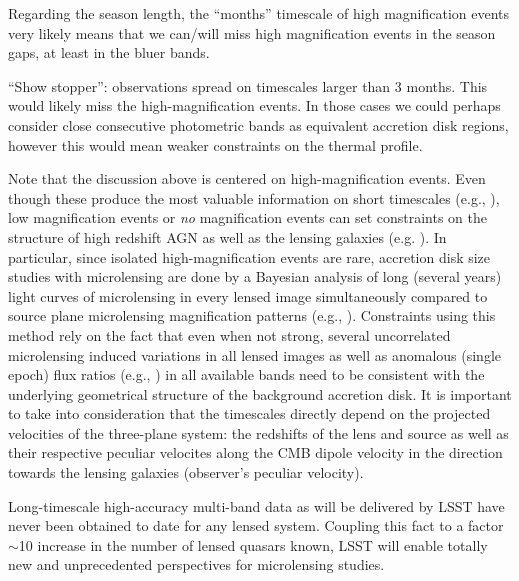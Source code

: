 Regarding the season length, the ``months'' timescale of high
magnification events very likely means that we can/will miss high
magnification events in the season gaps, at least in the bluer bands.

``Show stopper'': observations spread on timescales larger than 3 months.
This would likely miss the high-magnification events. In those cases
we could perhaps consider close consecutive photometric bands as
equivalent accretion disk regions, however this would mean weaker
constraints on the thermal profile.

Note that the discussion above is centered on high-magnification events. Even
though these produce the most valuable information on short timescales (e.g., \citealt{Anguita2008, eigenbrod2008}), low magnification events or
\emph{no} magnification events can set constraints on the structure of high
redshift AGN as well as the lensing galaxies (e.g. \citealt{gilmerino2005}). In particular, since isolated high-magnification events are rare, accretion disk size studies with microlensing are done by a Bayesian analysis of long (several years) light curves of microlensing in every lensed image simultaneously compared to source plane microlensing magnification patterns (e.g., \citealt{kochanek2004,blackburne2014}). Constraints using this method rely on the fact that even when not strong, several uncorrelated microlensing induced variations in all lensed images as well as anomalous (single epoch) flux ratios (e.g., \citealt{bate2008,rojas2014}) in all available bands need to be consistent with the underlying geometrical structure of the background accretion disk. It is important to take into consideration that the timescales directly depend on the projected velocities of the three-plane system: the redshifts of the lens
and source as well as their respective peculiar velocites along the CMB dipole velocity in the direction towards the lensing galaxies (observer's peculiar velocity).

Long-timescale high-accuracy multi-band data as will be delivered by
LSST have never been obtained to date for any lensed system. Coupling this fact
to a factor $\sim$10 increase in the number of lensed quasars known, LSST will
enable totally new and unprecedented perspectives for microlensing studies.

%

